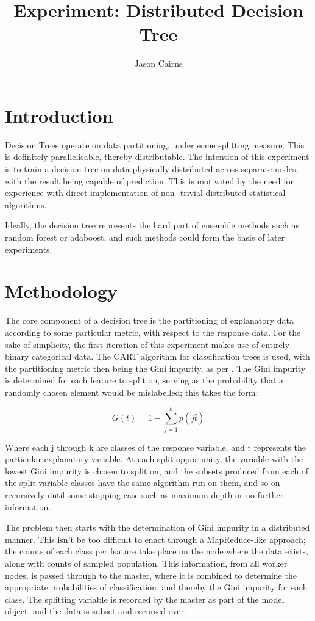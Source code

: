 \documentclass[a4paper,10pt]{article}
\begin{document}
\title{Experiment: Distributed Decision Tree}
\author{Jason Cairns}
  
\maketitle

\section{Introduction}

Decision Trees operate on data partitioning, under some splitting measure.
This is definitely parallelisable, thereby distributable.
The intention of this experiment is to train a decision tree on data physically
distributed across separate nodes, with the result being capable of prediction.
This is motivated by the need for experience with direct implementation of non-
trivial distributed statistical algorithms.

Ideally, the decision tree represents the hard part of ensemble methods such as
random forest or adaboost, and such methods could form the basis of later
experiments.

\section{Methodology}

The core component of a decision tree is the partitioning of explanatory data
according to some particular metric, with respect to the response data.
For the sake of simplicity, the first iteration of this experiment makes use of
entirely binary categorical data.
The CART algorithm for classification trees is used, with the partitioning
metric then being the Gini impurity, as per \cite{breiman1993}.
The Gini impurity is determined for each feature to split on, serving as the
probability that a randomly chosen element would be mislabelled; this takes the
form:

\[G(t) = 1 - \sum_{j=1}^{k} p(j \bar t)\]

Where each j through k are classes of the response variable, and t represents
the particular explanatory variable. 
At each split opportunity, the variable with the lowest Gini impurity is chosen
to split on, and the subsets produced from each of the split variable classes
have the same algorithm run on them, and so on recursively until some stopping
case such as maximum depth or no further information.

The problem then starts with the determination of Gini impurity in a distributed
manner.
This isn't be too difficult to enact through a MapReduce-like approach;
the counts of each class per feature take place on the node where the data
exists, along with counts of sampled population.
This information, from all worker nodes, is passed through to the master, where
it is combined to determine the appropriate probabilities of classification,
and thereby the Gini impurity for each class.
The splitting variable is recorded by the master as part of the model object,
and the data is subset and recursed over.
\end{document}
